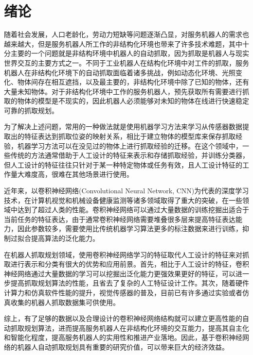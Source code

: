 ﻿%

\chapter{绪论}

随着社会发展，人口老龄化，劳动力短缺等问题逐渐凸显，对服务机器人的需求也越来越大，但是服务机器人所工作的非结构化环境也带来了许多技术难题，其中十分主要的一个问题就是非结构环境中机器人的自动抓取，因为抓取是机器人与现实世界交互的主要方式之一。不同于工业机器人在结构化环境中对工件的抓取，服务机器人在非结构化环境下的自动抓取面临着诸多挑战，例如动态化环境、光照变化、物体间存在相互遮挡，以及最主要的，非结构化环境中除了已知的物体，还有大量未知物体。对于非结构化环境中工作的服务机器人，预先获取所有需要进行抓取的物体的模型是不现实的，因此机器人必须能够对未知的物体在线进行快速稳定可靠的抓取规划。

为了解决上述问题，常用的一种做法就是使用机器学习方法来学习从传感器数据提取出的特征表达到抓取位姿的映射关系，相比于建立物体的模型库来保存抓取经验，机器学习方法可以在没见过的物体上进行抓取经验的迁移。在这个领域中，一些传统的方法通常借助于人工设计的特征来表示和存储抓取经验，并训练分类器，但人工设计的特征往往只针对于某一种特定物体或任务有效，且人工设计特征的工作量大难度高，很难在其他场景进行使用。
 
近年来，以卷积神经网络(Convolutional Neural Network, CNN)为代表的深度学习技术，在计算机视觉和机械设备健康监测等诸多领域取得了重大的突破，在一些领域中达到了超过人类的性能。卷积神经网络可以通过大量数据的训练挖掘出适合于当前任务的特征表达，由于通常卷积神经网络需要堆叠很多层来提高特征表达能力，因此参数较多，需要使用比传统机器学习算法更多的标注数据来进行训练，抑制过拟合提高算法的泛化能力。

在机器人抓取规划领域，使用卷积神经网络学习的特征取代人工设计的特征来对抓取进行表示和分类有很大的优势和应用前景。首先，相比于人工设计的特征，卷积神经网络通过大量数据的学习可以挖掘出泛化能力更强效果更好的特征，可以进一步提高抓取规划算法的性能，且省去了复杂的人工特征设计工作。其次，随着硬件计算力和仿真软件性能的提升，视觉传感器的普及，目前已有许多通过实验或者仿真收集的机器人抓取数据集可供使用。
 
综上，有了足够的数据以及合理设计的卷积神经网络结构就可以建立更高性能的自动抓取规划算法，进而提高服务机器人在非结构化环境的交互能力，提高其自主化和智能化程度，提高服务机器人的实用性和推进产业落地。因此，基于卷积神经网络的机器人自动抓取规划具有重要的研究价值，可以带来巨大的经济效益。